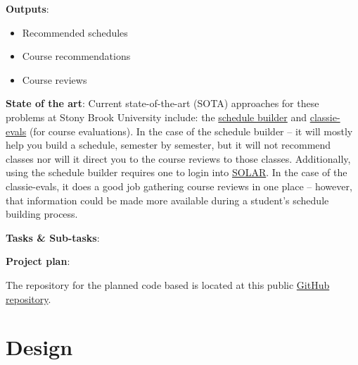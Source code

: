 \documentclass[12pt]{article}
\def \repoLink{https://github.com/AdebayoBraimah/CSE505}
\begin{document}
    \textbf{Outputs}:

    \begin{itemize}
        \label{items:outputs}
        \item Recommended schedules
        \item Course recommendations
        \item Course reviews
    \end{itemize}


    \textbf{State of the art}: Current state-of-the-art (SOTA) approaches for these problems at Stony Brook University include: the \href{https://you.stonybrook.edu/uaamedia/schedulebuilder/}{schedule builder} and \href{https://classie-evals.stonybrook.edu/}{classie-evals} (for course evaluations). In the case of the schedule builder -- it will mostly help you build a schedule, semester by semester\cite{sched}, but it will not recommend classes nor will it direct you to the course reviews to those classes. Additionally, using the schedule builder requires one to login into \href{https://it.stonybrook.edu/services/solar}{SOLAR}\cite{sched}. In the case of the classie-evals, it does a good job gathering course reviews in one place\cite{class} -- however, that information could be made more available during a student's schedule building process.

    \textbf{Tasks \& Sub-tasks}:

    \textbf{Project plan}:

    The repository for the planned code based is located at this public \href{\repoLink}{GitHub repository}.
    
    \section{Design}
    \label{sec:design}
    
    

    \newpage
    
    
    
    
\end{document}
